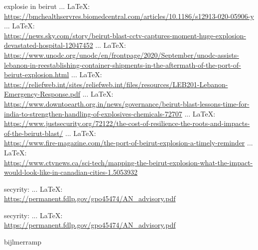 \begin{thebibliography}{99}
{{{{{{{							
							explosie in beirut
							 ... \LaTeX:\\ \url{https://bmchealthservres.biomedcentral.com/articles/10.1186/s12913-020-05906-y}
							 ... \LaTeX:\\ \url{https://news.sky.com/story/beirut-blast-cctv-captures-moment-huge-explosion-devastated-hospital-12047452}
							 ... \LaTeX:\\ \url{https://www.unodc.org/unodc/en/frontpage/2020/September/unodc-assists-lebanon-in-reestablishing-container-shipments-in-the-aftermath-of-the-port-of-beirut-explosion.html}
							 ... \LaTeX:\\ \url{https://reliefweb.int/sites/reliefweb.int/files/resources/LEB201-Lebanon-Emergency-Response.pdf}
							 ... \LaTeX:\\ \url{https://www.downtoearth.org.in/news/governance/beirut-blast-lessons-time-for-india-to-strengthen-handling-of-explosives-chemicals-72707}
							 ... \LaTeX:\\ \url{https://www.justsecurity.org/72122/the-cost-of-resilience-the-roots-and-impacts-of-the-beirut-blast/}
							 ... \LaTeX:\\ \url{https://www.fire-magazine.com/the-port-of-beirut-explosion-a-timely-reminder}
							 ... \LaTeX:\\ \url{https://www.ctvnews.ca/sci-tech/mapping-the-beirut-explosion-what-the-impact-would-look-like-in-canadian-cities-1.5053932}
							
							
							secyrity:
							 ... \LaTeX:\\ \url{https://permanent.fdlp.gov/gpo45474/AN_advisory.pdf}
							
							
							secyrity:
							 ... \LaTeX:\\ \url{https://permanent.fdlp.gov/gpo45474/AN_advisory.pdf}
							
							
							
							
							
							
							
							
							bijlmerramp
							
							
							
}}}}}}}
\end{thebibliography}
